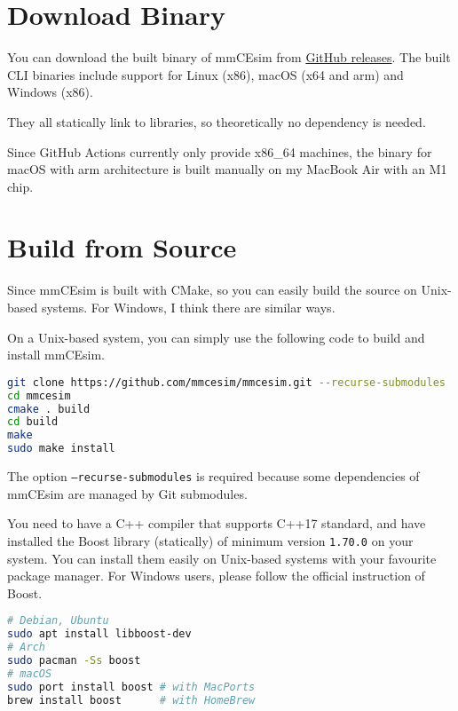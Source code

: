 \section{Download Binary}
You can download the built binary of mmCEsim from \href{https://github.com/mmcesim/mmcesim/releases}{GitHub releases}.
The built CLI binaries include support for Linux (x86), macOS (x64 and arm) and Windows (x86).

They all statically link to libraries, so theoretically no dependency is needed.

\begin{tip}[Note]
  Since GitHub Actions currently only provide x86\_64 machines,
  the binary for macOS with arm architecture is built manually on my MacBook Air with an M1 chip.
\end{tip}

\section{Build from Source}

Since mmCEsim is built with CMake, so you can easily build the source on Unix-based systems.
For Windows, I think there are similar ways.

On a Unix-based system, you can simply use the following code to build and install mmCEsim.
\begin{lstlisting}[language=sh, morekeywords={git, cmake, make, sudo}, alsoletter={.}]
git clone https://github.com/mmcesim/mmcesim.git --recurse-submodules
cd mmcesim
cmake . build
cd build
make
sudo make install
\end{lstlisting}

\begin{remark}
  The option \texttt{--recurse-submodules} is required because some dependencies of mmCEsim
  are managed by Git submodules.
\end{remark}

You need to have a C++ compiler that supports C++17 standard,
and have installed the Boost library (statically) of minimum version \texttt{1.70.0} on your system.
You can install them easily on Unix-based systems with your favourite package manager.
For Windows users, please follow the official instruction of Boost.
\begin{lstlisting}[language=sh, morekeywords={sudo, apt, pacman, port, brew}]
# Debian, Ubuntu
sudo apt install libboost-dev
# Arch
sudo pacman -Ss boost
# macOS
sudo port install boost # with MacPorts
brew install boost      # with HomeBrew
\end{lstlisting}

